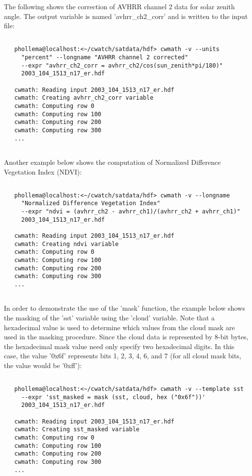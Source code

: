   The following shows the correction of AVHRR channel 2 data for solar zenith angle. The output variable is named 'avhrr\_ch2\_corr' and is written to the input file: \begin{verbatim}

   phollema@localhost:<~/cwatch/satdata/hdf> cwmath -v --units 
     "percent" --longname "AVHRR channel 2 corrected" 
     --expr "avhrr_ch2_corr = avhrr_ch2/cos(sun_zenith*pi/180)" 
     2003_104_1513_n17_er.hdf

   cwmath: Reading input 2003_104_1513_n17_er.hdf
   cwmath: Creating avhrr_ch2_corr variable
   cwmath: Computing row 0
   cwmath: Computing row 100
   cwmath: Computing row 200
   cwmath: Computing row 300
   ...
 
\end{verbatim}
 Another example below shows the computation of Normalized Difference Vegetation Index (NDVI): \begin{verbatim}

   phollema@localhost:<~/cwatch/satdata/hdf> cwmath -v --longname 
     "Normalized Difference Vegetation Index" 
     --expr "ndvi = (avhrr_ch2 - avhrr_ch1)/(avhrr_ch2 + avhrr_ch1)" 
     2003_104_1513_n17_er.hdf

   cwmath: Reading input 2003_104_1513_n17_er.hdf
   cwmath: Creating ndvi variable
   cwmath: Computing row 0
   cwmath: Computing row 100
   cwmath: Computing row 200
   cwmath: Computing row 300
   ...
 
\end{verbatim}
 In order to demonstrate the use of the 'mask' function, the example below shows the masking of the 'sst' variable using the 'cloud' variable. Note that a hexadecimal value is used to determine which values from the cloud mask are used in the masking procedure. Since the cloud data is represented by 8-bit bytes, the hexadecimal mask value need only specify two hexadecimal digits. In this case, the value '0x6f' represents bits 1, 2, 3, 4, 6, and 7 (for all cloud mask bits, the value would be '0xff'): \begin{verbatim}

   phollema@localhost:<~/cwatch/satdata/hdf> cwmath -v --template sst
     --expr 'sst_masked = mask (sst, cloud, hex ("0x6f"))'
     2003_104_1513_n17_er.hdf

   cwmath: Reading input 2003_104_1513_n17_er.hdf
   cwmath: Creating sst_masked variable
   cwmath: Computing row 0
   cwmath: Computing row 100
   cwmath: Computing row 200
   cwmath: Computing row 300
   ...
 
\end{verbatim}
